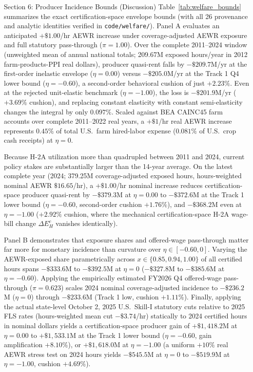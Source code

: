 \begin{llmdraft}{Section 6: Producer Incidence Bounds (Discussion)}
Table~\ref{tab:welfare_bounds} summarizes the exact certification-space
envelope bounds (with all 26 provenance and analytic identities verified in
\texttt{code/welfare/}). Panel A evaluates an anticipated $+\$1.00$/hr AEWR increase
under coverage-adjusted AEWR exposure and full statutory pass-through
($\pi = 1.00$). Over the complete 2011--2024 window (unweighted mean of annual
national totals; 209.67M exposed hours/year in 2012 farm-products-PPI real
dollars), producer quasi-rent falls by $-\$209.7$M/yr at the first-order
inelastic envelope ($\eta = 0.00$) versus $-\$205.0$M/yr at the Track 1 Q4
lower bound ($\eta = -0.60$), a second-order behavioral cushion of just
$+2.23\%$. Even at the rejected unit-elastic benchmark ($\eta = -1.00$),
the loss is $-\$201.9$M/yr ($+3.69\%$ cushion), and replacing constant
elasticity with constant semi-elasticity changes the integral by only
$0.097\%$. Scaled against BEA CAINC45 farm accounts over complete 2011--2022
real years, a $+\$1$/hr real AEWR increase represents $0.45\%$ of total U.S.\
farm hired-labor expense ($0.081\%$ of U.S.\ crop cash receipts) at $\eta = 0$.

Because H-2A utilization more than quadrupled between 2011 and 2024, current
policy stakes are substantially larger than the 14-year average. On the latest
complete year (2024; 379.25M coverage-adjusted exposed hours, hours-weighted
nominal AEWR $\$16.65$/hr), a $+\$1.00$/hr nominal increase reduces
certification-space producer quasi-rent by $-\$379.3$M at $\eta = 0.00$ to
$-\$372.6$M at the Track 1 lower bound ($\eta = -0.60$, second-order
cushion $+1.76\%$), and $-\$368.2$M even at $\eta = -1.00$ ($+2.92\%$
cushion, where the mechanical certification-space H-2A wage-bill change
$\Delta E^c_H$ vanishes identically).

Panel B demonstrates that exposure shares and offered-wage pass-through matter
far more for monetary incidence than curvature over $\eta \in [-0.60, 0]$.
Varying the AEWR-exposed share parametrically across $x \in \{0.85, 0.94,
1.00\}$ of all certified hours spans $-\$333.6$M to $-\$392.5$M at $\eta=0$
($-\$327.8$M to $-\$385.6$M at $\eta=-0.60$). Applying the empirically
estimated FY2026 Q4 offered-wage pass-through ($\pi = 0.623$) scales 2024
nominal coverage-adjusted incidence to $-\$236.2$M ($\eta=0$) through
$-\$233.6$M (Track 1 low, cushion $+1.11\%$). Finally, applying the actual
state-level October 2, 2025 U.S.\ Skill-I statutory cuts relative to 2025 FLS
rates (hours-weighted mean cut $-\$3.74$/hr) statically to 2024 certified hours
in nominal dollars yields a certification-space producer gain of $+\$1,418.2$M
at $\eta = 0.00$ to $+\$1,533.1$M at the Track 1 lower bound ($\eta =
-0.60$, gain amplification $+8.10\%$), or $+\$1,618.0$M at $\eta = -1.00$
(a uniform $+10\%$ real AEWR stress test on 2024 hours yields $-\$545.5$M at
$\eta=0$ to $-\$519.9$M at $\eta=-1.00$, cushion $+4.69\%$).


\end{llmdraft}
